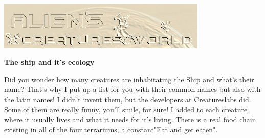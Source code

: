 \documentclass[11pt,twoside,a4paper]{article}
\def\MainTitle{The ship and it's ecology}
\begin{document}
\setlength\parindent{0pt}




\begin{center} \includegraphics[width=0.75\textwidth]{img/acw_logo8.jpg} \end{center}

\begin{center}
	\textbf{\Large \MainTitle }~\\
\end{center}

\tableofcontents

\vfill



Did you wonder how many creatures are inhabitating the Ship and what's their name? That's why I put up a list for you with their common names but also with the latin names! I didn't invent them, but the developers at Creatureslabs did. Some of them are really funny, you'll smile, for sure! I added to each creature where it usually lives and what it needs for it's living. There is a real food chain existing in all of the four terrariums, a constant"Eat and get eaten". ~\\
\end{document}
